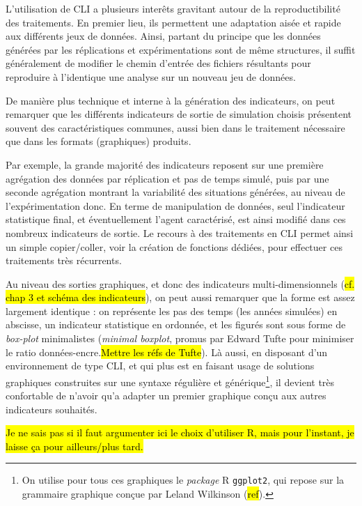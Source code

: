 	L'utilisation de CLI a plusieurs interêts gravitant autour de la reproductibilité des traitements.
	En premier lieu, ils permettent une adaptation aisée et rapide aux différents jeux de données.
	Ainsi, partant du principe que les données générées par les réplications et expérimentations sont de même structures, il suffit généralement de modifier le chemin d'entrée des fichiers résultants pour reproduire à l'identique une analyse sur un nouveau jeu de données.

	De manière plus technique et interne à la génération des indicateurs, on peut remarquer que les différents indicateurs de sortie de simulation choisis présentent souvent des caractéristiques communes, aussi bien dans le traitement nécessaire que dans les formats (graphiques) produits.

	Par exemple, la grande majorité des indicateurs reposent sur une première agrégation des données par réplication et pas de temps simulé, puis par une seconde agrégation montrant la variabilité des situations générées, au niveau de l'expérimentation donc.
	En terme de manipulation de données, seul l'indicateur statistique final, et éventuellement l'agent caractérisé, est ainsi modifié dans ces nombreux indicateurs de sortie.
	Le recours à des traitements en CLI permet ainsi un simple copier/coller, voir la création de fonctions dédiées, pour effectuer ces traitements très récurrents.

	Au niveau des sorties graphiques, et donc des indicateurs multi-dimensionnels (\hl{cf. chap 3 et schéma des indicateurs}), on peut aussi remarquer que la forme est assez largement identique : on représente les pas des temps (les années simulées) en abscisse, un indicateur statistique en ordonnée, et les figurés sont sous forme de \textit{box-plot} minimalistes (\og \textit{minimal boxplot}\fg{}, promus par Edward Tufte pour minimiser le ratio données-encre.\hl{Mettre les réfs de Tufte}).
	Là aussi, en disposant d'un environnement de type CLI, et qui plus est en faisant usage de solutions graphiques construites sur une syntaxe régulière et générique\footnote{
	On utilise pour tous ces graphiques le \textit{package} R \texttt{ggplot2}, qui repose sur la grammaire graphique conçue par Leland Wilkinson (\hl{ref}).
	}, il devient très confortable de n'avoir qu'a adapter un premier graphique conçu aux autres indicateurs souhaités.

	\hl{Je ne sais pas si il faut argumenter ici le choix d'utiliser R, mais pour l'instant, je laisse ça pour ailleurs/plus tard.}\\
	
